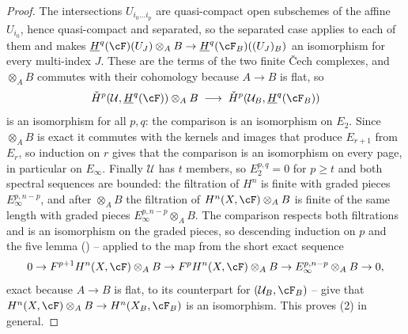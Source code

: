 \begin{proof}
The intersections $U_{i_0\dots i_p}$ are quasi-compact open subschemes
of the affine $U_{i_0}$, hence quasi-compact and separated, so the
separated case applies to each of them and makes
$\underline H^q(\cF)(U_J)\otimes_AB\to\underline H^q(\cF_B)((U_J)_B)$
an isomorphism for every multi-index $J$.  These are the terms of the
two finite Čech complexes, and $\otimes_AB$ commutes with their
cohomology because $A\to B$ is flat, so
\[
\check H^p(\mathcal U,\underline H^q(\cF))\otimes_AB
\;\longrightarrow\;\check H^p(\mathcal U_B,\underline H^q(\cF_B))
\]
is an isomorphism for all $p,q$: the comparison is an isomorphism on
$E_2$.  Since $\otimes_AB$ is exact it commutes with the kernels and
images that produce $E_{r+1}$ from $E_r$, so induction on $r$ gives
that the comparison is an isomorphism on every page, in particular on
$E_\infty$.  Finally $\mathcal U$ has $t$ members, so $E_2^{p,q}=0$ for
$p\ge t$ and both spectral sequences are bounded: the filtration of
$H^n$ is finite with graded pieces $E_\infty^{p,n-p}$, and after
$\otimes_AB$ the filtration of $H^n(X,\cF)\otimes_AB$ is finite of the
same length with graded pieces $E_\infty^{p,n-p}\otimes_AB$.  The
comparison respects both filtrations and is an isomorphism on the
graded pieces, so descending induction on $p$ and the five lemma
() -- applied to the map from the short exact
sequence
\[
0\to F^{p+1}H^n(X,\cF)\otimes_AB\to F^pH^n(X,\cF)\otimes_AB\to
E_\infty^{p,n-p}\otimes_AB\to0 ,
\]
exact because $A\to B$ is flat, to its counterpart for
$(\mathcal U_B,\cF_B)$ -- give that
$H^n(X,\cF)\otimes_AB\to H^n(X_B,\cF_B)$ is an isomorphism.  This
proves (2) in general.


\end{proof}
